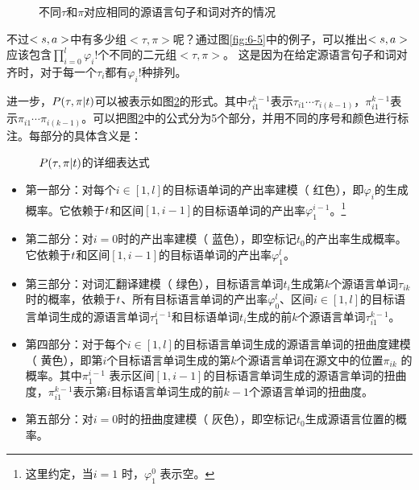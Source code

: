 \begin{figure}[htp]
    \centering

   \caption{不同$\tau$和$\pi$对应相同的源语言句子和词对齐的情况}
   \label{fig:6-6}
\end{figure}


\parinterval 不过$<{s},{a}>$中有多少组$<\tau,\pi>$呢？通过图\ref{fig:6-5}中的例子，可以推出$<{s},{a}>$应该包含$\prod_{i=0}^{l}{\varphi_i !}$个不同的二元组$<\tau,\pi>$。 这是因为在给定源语言句子和词对齐时，对于每一个$\tau_i$都有$\varphi_{i}!$种排列。


\parinterval 进一步，${P}(\tau,\pi|{t})$可以被表示如图\ref{fig:6-7}的形式。其中$\tau_{i1}^{k-1}$表示$\tau_{i1}\cdots \tau_{i(k-1)}$，$\pi_{i1}^{ k-1}$表示$\pi_{i1}\cdots \pi_{i(k-1)}$。可以把图\ref{fig:6-7}中的公式分为5个部分，并用不同的序号和颜色进行标注。每部分的具体含义是：

\begin{figure}[htp]
    \centering

   \caption{{${P}(\tau,\pi|t)$}的详细表达式}
\setlength{\belowcaptionskip}{-0.5em}
   \label{fig:6-7}
\end{figure}

\begin{itemize}
\vspace{0.5em}
\item 第一部分：对每个$i\in[1,l]$的目标语单词的产出率建模（{\color{red!70} 红色}），即$\varphi_i$的生成概率。它依赖于${t}$和区间$[1,i-1]$的目标语单词的产出率$\varphi_1^{i-1}$。\footnote{这里约定，当$i=1$ 时，$\varphi_1^0$ 表示空。}
\vspace{0.5em}
\item 第二部分：对$i=0$时的产出率建模（{\color{blue!70} 蓝色}），即空标记$t_0$的产出率生成概率。它依赖于${t}$和区间$[1,i-1]$的目标语单词的产出率$\varphi_1^l$。
\vspace{0.5em}
\item 第三部分：对词汇翻译建模（{\color{green!70} 绿色}），目标语言单词$t_i$生成第$k$个源语言单词$\tau_{ik}$时的概率，依赖于${t}$、所有目标语言单词的产出率$\varphi_0^l$、区间$i\in[1,l]$的目标语言单词生成的源语言单词$\tau_1^{i-1}$和目标语单词$t_i$生成的前$k$个源语言单词$\tau_{i1}^{k-1}$。
\vspace{0.5em}
\item 第四部分：对于每个$i\in[1,l]$的目标语言单词生成的源语言单词的扭曲度建模（{\color{yellow!70!black} 黄色}），即第$i$个目标语言单词生成的第$k$个源语言单词在源文中的位置$\pi_{ik}$ 的概率。其中$\pi_1^{i-1}$ 表示区间$[1,i-1]$的目标语言单词生成的源语言单词的扭曲度，$\pi_{i1}^{k-1}$表示第$i$目标语言单词生成的前$k-1$个源语言单词的扭曲度。
\vspace{0.5em}
\item 第五部分：对$i=0$时的扭曲度建模（{\color{gray!70} 灰色}），即空标记$t_0$生成源语言位置的概率。
\end{itemize}

